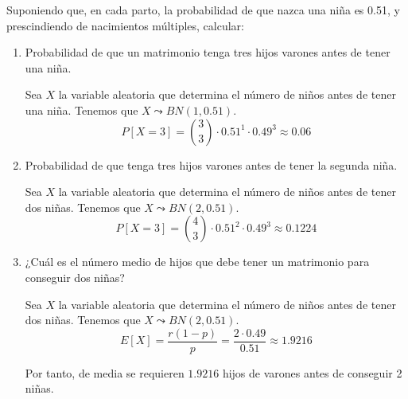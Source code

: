 \begin{ejercicio}
    Suponiendo que, en cada parto, la probabilidad de que nazca una niña es 0.51, y prescindiendo de nacimientos múltiples, calcular:
    \begin{enumerate}
        \item Probabilidad de que un matrimonio tenga tres hijos varones antes de tener una niña.

        Sea $X$ la variable aleatoria que determina el número de niños antes de tener una niña. Tenemos que $X\leadsto BN(1, 0.51)$.
        \begin{equation*}
            P[X=3]=\binom{3}{3}\cdot 0.51^1 \cdot 0.49^{3} \approx 0.06   
        \end{equation*}
        
        \item Probabilidad de que tenga tres hijos varones antes de tener la segunda niña.

        Sea $X$ la variable aleatoria que determina el número de niños antes de tener dos niñas. Tenemos que $X\leadsto BN(2, 0.51)$.
        \begin{equation*}
            P[X=3]=\binom{4}{3}\cdot 0.51^2 \cdot 0.49^{3} \approx 0.1224   
        \end{equation*}
        
        \item ¿Cuál es el número medio de hijos que debe tener un matrimonio para conseguir dos niñas?

        Sea $X$ la variable aleatoria que determina el número de niños antes de tener dos niñas. Tenemos que $X\leadsto BN(2, 0.51)$.
        \begin{equation*}
            E[X]=\frac{r(1-p)}{p} = \frac{2\cdot 0.49}{0.51} \approx 1.9216  
        \end{equation*}

        Por tanto, de media se requieren $1.9216$ hijos de varones antes de conseguir 2 niñas.
        
    \end{enumerate}
\end{ejercicio}



